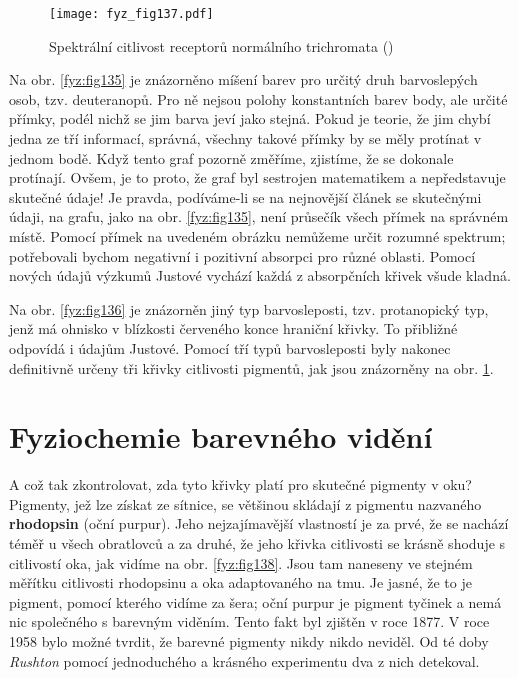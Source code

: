     \begin{figure}[ht!]  %
      \centering
      \texttt{[image: fyz\_fig137.pdf]}
      \caption{Spektrální citlivost receptorů normálního trichromata
              (\cite[s.~477]{Feynman01})}
      \label{fyz:fig137}
    \end{figure}
    Na obr. \ref{fyz:fig135} je znázorněno míšení barev pro určitý druh barvoslepých osob, tzv. 
    deuteranopů. Pro ně nejsou polohy konstantních barev body, ale určité přímky, podél nichž se 
    jim barva jeví jako stejná. Pokud je teorie, že jim chybí jedna ze tří informací, správná, 
    všechny takové přímky by se měly protínat v jednom bodě. Když tento graf pozorně změříme, 
    zjistíme, že se dokonale protínají. Ovšem, je to proto, že graf byl sestrojen matematikem a 
    nepředstavuje skutečné údaje! Je pravda, podíváme-li se na nejnovější článek se skutečnými 
    údaji, na grafu, jako na obr. \ref{fyz:fig135}, není průsečík všech přímek na správném místě. 
    Pomocí přímek na uvedeném obrázku nemůžeme určit rozumné spektrum; potřebovali bychom negativní 
    i pozitivní absorpci pro různé oblasti. Pomocí nových údajů výzkumů Justové vychází každá z 
    absorpčních křivek všude kladná. 

    Na obr. \ref{fyz:fig136} je znázorněn jiný typ barvosleposti, tzv. protanopický typ, jenž má 
    ohnisko v blízkosti červeného konce hraniční křivky. To přibližné odpovídá i údajům Justové. 
    Pomocí tří typů barvosleposti byly nakonec definitivně určeny tři křivky citlivosti pigmentů, 
    jak jsou znázorněny na obr. \ref{fyz:fig137}.
    
  \section{Fyziochemie barevného vidění}\label{fyz:IchapXXXVsecVI}
    A což tak zkontrolovat, zda tyto křivky platí pro skutečné pigmenty v oku? Pigmenty, jež lze 
    získat ze sítnice, se většinou skládají z pigmentu nazvaného \textbf{rhodopsin} (oční purpur). 
    Jeho nejzajímavější vlastností je za prvé, že se nachází téměř u všech obratlovců a za druhé, 
    že jeho křivka citlivosti se krásně shoduje s citlivostí oka, jak vidíme na obr. 
    \ref{fyz:fig138}. Jsou tam naneseny ve stejném měřítku citlivosti rhodopsinu a oka adaptovaného 
    na tmu. Je jasné, že to je pigment, pomocí kterého vidíme za šera; oční purpur je pigment 
    tyčinek a nemá nic společného s barevným viděním. Tento fakt byl zjištěn v roce \num{1877}. V 
    roce 1958 bylo možné tvrdit, že barevné pigmenty nikdy nikdo neviděl. Od té doby \emph{Rushton} 
    pomocí jednoduchého a krásného experimentu dva z nich detekoval.


